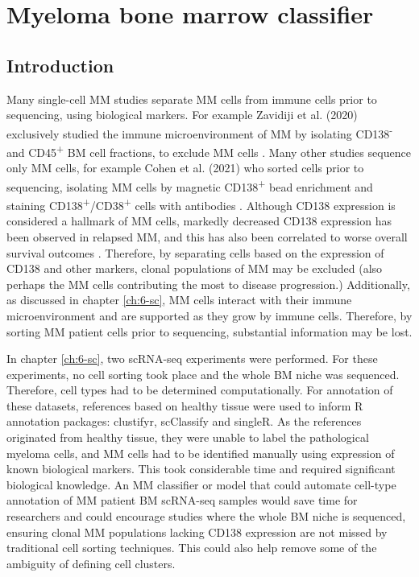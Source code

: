 \section{Myeloma bone marrow classifier}\label{sec:MM_classifier}
\subsection{Introduction}

Many single-cell MM studies separate MM cells from immune cells prior to sequencing, using biological markers.
For example Zavidiji et al. (2020) exclusively studied the immune microenvironment of MM by isolating CD138\textsuperscript{-} and CD45\textsuperscript{+} BM cell fractions, to exclude MM cells \cite{zavidij2020single}.
Many other studies sequence only MM cells, for example Cohen et al. (2021) who sorted cells prior to sequencing, isolating MM cells by magnetic CD138\textsuperscript{+} bead enrichment and staining CD138\textsuperscript{+}/CD38\textsuperscript{+} cells with antibodies \cite{cohen2021identification}.
Although CD138 expression is considered a hallmark of MM cells, markedly decreased CD138 expression has been observed in relapsed MM, and this has also been correlated to worse overall survival outcomes \cite{kawano2012multiple}.
Therefore, by separating cells based on the expression of CD138 and other markers, clonal populations of MM may be excluded (also perhaps the MM cells contributing the most to disease progression.)
Additionally, as discussed in chapter \ref{ch:6-sc}, MM cells interact with their immune microenvironment and are supported as they grow by immune cells.
Therefore, by sorting MM patient cells prior to sequencing, substantial information may be lost.

In chapter \ref{ch:6-sc}, two scRNA-seq experiments were performed.
For these experiments, no cell sorting took place and the whole BM niche was sequenced.
Therefore, cell types had to be determined computationally.
For annotation of these datasets, references based on healthy tissue were used to inform R annotation packages: clustifyr, scClassify and singleR.
As the references originated from healthy tissue, they were unable to label the pathological myeloma cells, and MM cells had to be identified manually using expression of known biological markers.
This took considerable time and required significant biological knowledge.
An MM classifier or model that could automate cell-type annotation of MM patient BM scRNA-seq samples would save time for researchers and could encourage studies where the whole BM niche is sequenced, ensuring clonal MM populations lacking CD138 expression are not missed by traditional cell sorting techniques.
This could also help remove some of the ambiguity of defining cell clusters.

